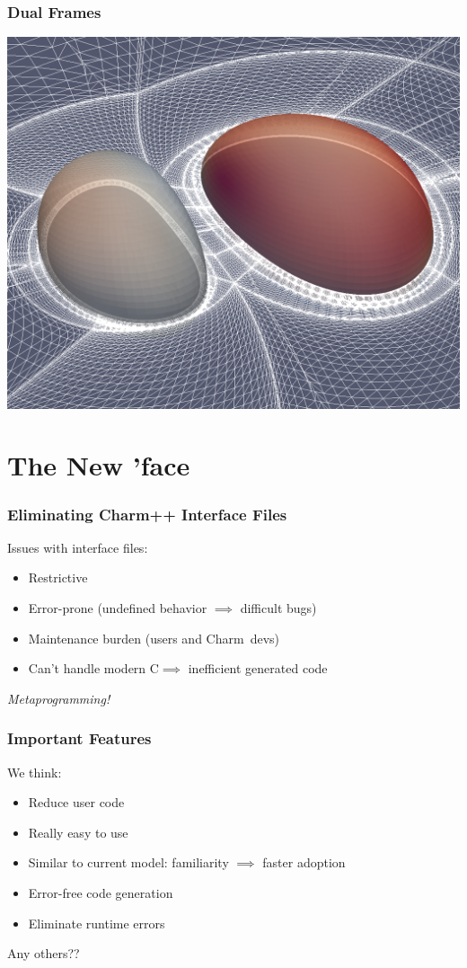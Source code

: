 \documentclass[svgnames,tikz,serif,ragged2e]{beamer}
\newcommand\CC{C\nolinebreak[4]\hspace{-.05em}\raisebox{.4ex}{\relsize{-3}{\textbf{++}}}}
\newcommand\Charm{Charm\nolinebreak[4]\hspace{-.05em}\raisebox{.4ex}{\relsize{-3}{\textbf{++}}}}
\begin{document}
\begin{frame}
  \frametitle{Dual Frames}
  \vspace{-0.15cm}
  \begin{center}
    \includegraphics[height=.86\textheight]{PostUltimateGridPlusHorizons}
  \end{center}
\end{frame}

\section{The New 'face}

\begin{frame}
  \frametitle{Eliminating Charm++ Interface Files}
  Issues with interface files:
  \begin{itemize}
  \item Restrictive
  \item Error-prone (undefined behavior $\implies$ difficult bugs)
  \item Maintenance burden (users and \Charm~devs)
  \item Can't handle modern \CC $\implies$ inefficient generated code
  \end{itemize}
  \vspace{1.0cm}
  \pause
  \begin{center}
    {\huge\textit{Metaprogramming!}}
  \end{center}
\end{frame}

\begin{frame}
  \frametitle{Important Features}
  We think:
  \begin{itemize}
  \item Reduce user code
  \item Really easy to use
  \item Similar to current model: familiarity $\implies$ faster adoption
  \item Error-free code generation
  \item Eliminate runtime errors
  \end{itemize}

  Any others??
\end{frame}
\end{document}
